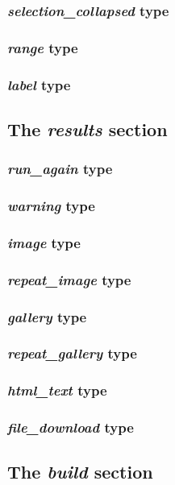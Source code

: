 \subsubsection{ \emph{selection\_collapsed} type}
\subsubsection{ \emph{range} type}
\subsubsection{ \emph{label} type}

\subsection{The \emph{results} section}

\subsubsection{ \emph{run\_again} type}
\subsubsection{ \emph{warning} type}
\subsubsection{ \emph{image} type}
\subsubsection{ \emph{repeat\_image} type}
\subsubsection{ \emph{gallery} type}
\subsubsection{ \emph{repeat\_gallery} type}
\subsubsection{ \emph{html\_text} type}
\subsubsection{ \emph{file\_download} type}

\subsection{The \emph{build} section}
